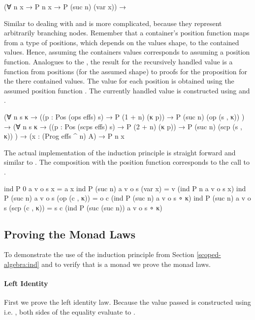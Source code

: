 \begin{AgdaAlign}
\begin{code}
  (∀ {n x} → P n x → P (suc n) (var x))  →
\end{code}
Similar to  dealing with  and
 is more complicated, because they represent
arbitrarily branching nodes.
Remember that a container's position function maps from a type of positions,
which depends on the values shape, to the contained values.
Hence, assuming the containers values corresponds to assuming a position
function.
Analogues to the , the result for the recursively handled value
is a function from positions (for the assumed shape) to proofs for the
proposition for the there contained values.
The value for each position is obtained using the assumed position function
.
The currently handled value is constructed using  and  
.
\begin{code}
  (∀ {n} s {κ}  →  ((p : Pos (ops   effs) s) → P (1 + n)  (κ p))  → P (suc n) (op   (s , κ))  )  →
  (∀ {n} s {κ}  →  ((p : Pos (scps  effs) s) → P (2 + n)  (κ p))  → P (suc n) (scp  (s , κ))  )  →
  (x : (Prog effs ^ n) A) → P n x
\end{code}
The actual implementation of the induction principle is straight forward and
similar to .
The composition with the position function corresponds to the call to
.
\begin{code}
ind P 0       a v o s x               = a x
ind P (suc n) a v o s (var x)         = v    (ind P n              a v o s x)
ind P (suc n) a v o s (op   (c , κ))  = o c  (ind P (suc n)        a v o s ∘ κ)
ind P (suc n) a v o s (scp  (c , κ))  = s c  (ind P (suc (suc n))  a v o s ∘ κ)
\end{code}
\end{AgdaAlign}


\subsection{Proving the Monad Laws}
\label{scoped-algebra:monad-laws}

To demonstrate the use of the induction principle from Section
\ref{scoped-algebra:ind} and to verify that 
\AgdaSpace{}\AgdaSpace{}
is a monad we prove the monad laws.

\paragraph{Left Identity}
First we prove the left identity law.
Because the value passed \AgdaFunction{>>=} is constructed using
 i.e. , both sides of the
equality evaluate to \AgdaSpace{}.

